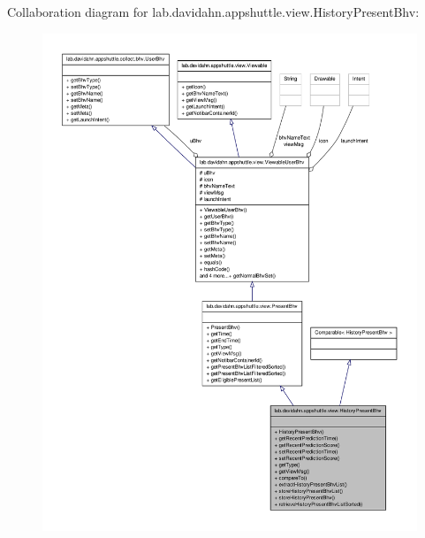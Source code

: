 \-Collaboration diagram for lab.\-davidahn.\-appshuttle.\-view.\-History\-Present\-Bhv\-:
\nopagebreak
\begin{figure}[H]
\begin{center}
\leavevmode
\includegraphics[width=350pt]{classlab_1_1davidahn_1_1appshuttle_1_1view_1_1_history_present_bhv__coll__graph}
\end{center}
\end{figure}
